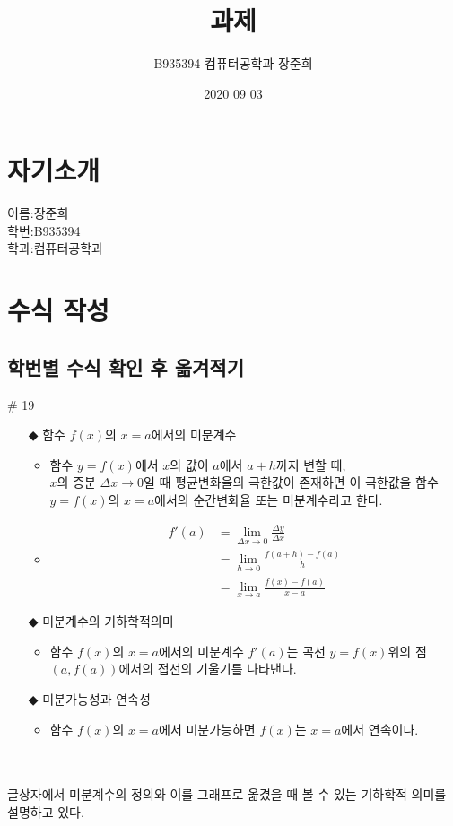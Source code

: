 \documentclass[a4paper]{article}
\begin{document}
\title{과제}
\author{B935394 컴퓨터공학과 장준희}
\date{2020 09 03}
\maketitle
\newpage
\section{자기소개}
이름:장준희\\학번:B935394\\학과:컴퓨터공학과\\
\section{수식 작성}
\subsection{학번별 수식 확인 후 옮겨적기}
\begin{boxedminipage}[l]{0.7\linewidth}
\# 19 \underline{}
\begin{itemize}
\item[$\Diamondblack$]함수 $f(x)$의 $x=a$에서의 미분계수
\begin{itemize}
\item 함수 $y=f(x)$에서 $x$의 값이 $a$에서 $a+h$까지 변할 때,\\ $x$의 증분 $\Delta x\to 0$일 때 평균변화율의 극한값이 존재하면 이 극한값을 함수 $y=f(x)$의 $x=a$에서의 순간변화율 또는 미분계수라고 한다.
\item\begin{align*}f'(a)&=\lim_{\Delta x\to 0}\frac{\Delta y}{\Delta x}\\&=\lim_{h\to 0}\frac{f(a+h)-f(a)}{h}\\&=\lim_{x\to a}\frac{f(x)-f(a)}{x-a}\end{align*}
\end{itemize}
\item[$\Diamondblack$]미분계수의 기하학적의미
\begin{itemize}
\item 함수 $f(x)$의 $x=a$에서의 미분계수 $f'(a)$는 곡선 $y=f(x)$위의 점 $(a,f(a))$에서의 접선의 기울기를 나타낸다.
\end{itemize}
\item[$\Diamondblack$]미분가능성과 연속성
\begin{itemize}
\item 함수 $f(x)$의 $x=a$에서 미분가능하면 $f(x)$는 $x=a$에서 연속이다.\\
\end{itemize}
\end{itemize}
\end{boxedminipage}
\newline\\\\
글상자에서 미분계수의 정의와 이를 그래프로 옮겼을 때 볼 수 있는 기하학적 의미를 설명하고 있다.\\
\newpage
\end{document}
